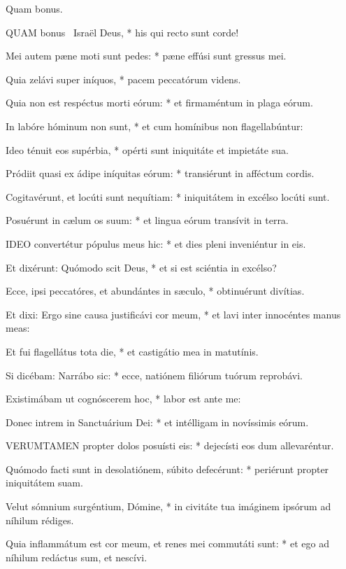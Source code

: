  Quam bonus. \textdagger


\lettrine[lines=2]{Q}{UAM} bonus \textdagger\ Israël Deus, * his qui recto sunt corde!

Mei autem pæne moti sunt pedes: * pæne effúsi sunt gressus mei.

Quia zelávi super iníquos, * pacem peccatórum videns.

Quia non est respéctus morti eórum: * et firmaméntum in plaga eórum.

In labóre hóminum non sunt, * et cum homínibus non flagellabúntur:

Ideo ténuit eos supérbia, * opérti sunt iniquitáte et impietáte sua.

Pródiit quasi ex ádipe iníquitas eórum: * transiérunt in afféctum cordis.

Cogitavérunt, et locúti sunt nequítiam: * iniquitátem in excélso locúti sunt.

Posuérunt in cælum os suum: * et lingua eórum transívit in terra.


\lettrine[lines=2]{I}{DEO} convertétur pópulus meus hic: * et dies pleni inveniéntur in eis.

Et dixérunt: Quómodo scit Deus, * et si est sciéntia in excélso?

Ecce, ipsi peccatóres, et abundántes in sæculo, * obtinuérunt divítias.

Et dixi: Ergo sine causa justificávi cor meum, * et lavi inter innocéntes manus meas:

Et fui flagellátus tota die, * et castigátio mea in matutínis.

Si dicébam: Narrábo sic: * ecce, natiónem filiórum tuórum reprobávi.

Existimábam ut cognóscerem hoc, * labor est ante me:

Donec intrem in Sanctuárium Dei: * et intélligam in novíssimis eórum.


\lettrine[lines=2]{V}{ERUMTAMEN} propter dolos posuísti eis: * dejecísti eos dum allevaréntur.

Quómodo facti sunt in desolatiónem, súbito defecérunt: * periérunt propter iniquitátem suam.

Velut sómnium surgéntium, Dómine, * in civitáte tua imáginem ipsórum ad níhilum rédiges.

Quia inflammátum est cor meum, et renes mei commutáti sunt: * et ego ad níhilum redáctus sum, et nescívi.

